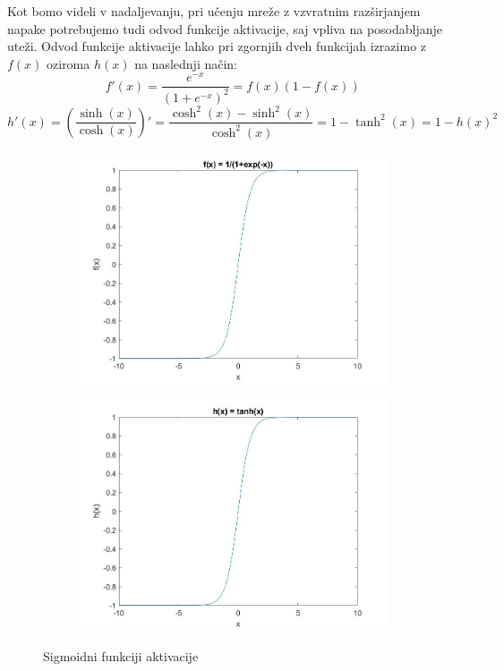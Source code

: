 \documentclass[mat1]{fmfdelo}
\begin{document}
Kot bomo videli v nadaljevanju, pri učenju mreže z vzvratnim razširjanjem napake potrebujemo tudi odvod funkcije aktivacije, saj vpliva na posodabljanje uteži. Odvod funkcije aktivacije lahko pri zgornjih dveh funkcijah izrazimo z $f(x)$ oziroma $h(x)$ na naslednji način:
%
\begin{equation}
f'(x) = \frac{e^{-x}}{(1+e^{-x})^2} = f(x)(1-f(x))
\end{equation}
%
\begin{equation}
h'(x) = \left(\frac{\sinh(x)}{\cosh(x)}\right)' = \frac{\cosh^2(x)- \sinh^2(x)}{\cosh^2(x)} = 1 - \tanh^2(x) = 1 - h(x)^2 
\end{equation}
%
\begin{figure}[!th]
\centering
\begin{subfigure}{.5\textwidth}
  \centering
  \includegraphics[width=.9\linewidth]{sig_exp.jpg}
\end{subfigure}%
\begin{subfigure}{.5\textwidth}
  \centering
  \includegraphics[width=.9\linewidth]{sig_tan.jpg}
\end{subfigure}
\caption{Sigmoidni funkciji aktivacije}
\label{fig:sigmoid}
\end{figure}
%
\end{document}
